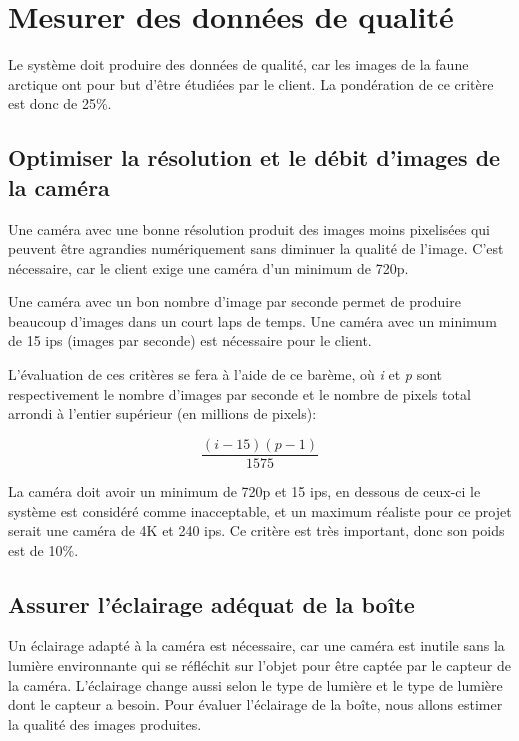\section{Mesurer des données de qualité}

Le système doit produire des données de qualité, car les images de la faune
arctique ont pour but d’être étudiées par le client. La pondération de ce
critère est donc de 25\%.

\subsection{Optimiser la résolution et le débit d'images de la caméra}

Une caméra avec une bonne résolution produit des images moins pixelisées qui
peuvent être agrandies numériquement sans diminuer la qualité de l’image. C’est
nécessaire, car le client exige une caméra d’un minimum de 720p.

Une caméra avec un bon nombre d’image par seconde permet de produire beaucoup
d’images dans un court laps de temps. Une caméra avec un minimum de 15 ips
(images par seconde) est nécessaire pour le client.

L’évaluation de ces critères se fera à l’aide de ce barème, où \textit{i} et
\textit{p} sont respectivement le nombre d’images par seconde et le nombre de
pixels total arrondi à l’entier supérieur (en millions de pixels):

\begin{equation}
  \frac{(i - 15)(p - 1)}{1575}
\end{equation}

La caméra doit avoir un minimum de 720p et 15 ips, en dessous de ceux-ci le
système est considéré comme inacceptable, et un maximum réaliste pour ce projet
serait une caméra de 4K et 240 ips. Ce critère est très important, donc son
poids est de 10\%.

\subsection{Assurer l'éclairage adéquat de la boîte}

Un éclairage adapté à la caméra est nécessaire, car une caméra est inutile sans
la lumière environnante qui se réfléchit sur l’objet pour être captée par le
capteur de la caméra. L’éclairage change aussi selon le type de lumière et le
type de lumière dont le capteur a besoin. Pour évaluer l’éclairage de la boîte,
nous allons estimer la qualité des images produites.

